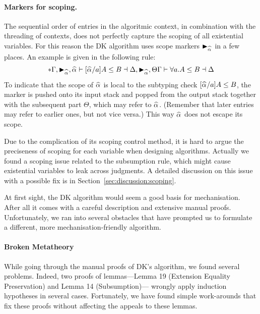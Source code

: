 \paragraph{Markers for scoping.}
The sequential order of entries in the algoritmic context, in combination with
the threading of contexts,  does not perfectly capture the scoping of all
existential variables. For this reason the DK algorithm uses scope markers
$\blacktriangleright_{\al}$ in a few places. An example is given in the following
rule:
\[
\inferrule*
  {\Gamma,\blacktriangleright_{\al}, \al \vdash [\al/a]A \le B \dashv \Delta,\blacktriangleright_{\al},\Theta}
  {\Gamma \vdash \forall a. A \le B \dashv \Delta}
\]
To indicate that the scope of $\al$ is local to the subtyping check
$[\al/a]A \le B$, the marker is pushed onto its input stack and popped
from the output stack together with the subsequent part $\Theta$, which may
refer to $\al$. 
(Remember that later entries may refer to earlier
ones, but not vice versa.) This way $\al$ does not escape its scope.
\begin{comment}
A type variable may have a similar functionality to the scoping markers.
An example rule that checks an expression against a polymorphic type is as follows:
$$
\inferrule*
{\Gm, a \vdash e \Lto A \dashv \Delta, a, \Theta}
{\Gm \vdash e \Lto \all A \dashv \Delta}
$$
\end{comment}

Due to the complication of its scoping control method,
it is hard to argue the preciseness of scoping for each variable when designing algorithms.
Actually we found a scoping issue related to the subsumption rule,
which might cause existential variables to leak across judgments.
A detailed discussion on this issue with a possible fix is in Section~\ref{sec:discussion:scoping}.


At first sight, the DK algorithm would seem a good basis for mechanisation. After
all it comes with a careful description and extensive manual proofs.
Unfortunately, we ran into several obstacles that have prompted us to formulate
a different, more mechanisation-friendly algorithm.

\paragraph{Broken Metatheory} %
While going through the manual proofs of DK's algorithm, we found several
problems.  Indeed, two proofs of lemmas---Lemma 19 (Extension Equality
Preservation) and Lemma 14 (Subsumption)--- wrongly apply induction hypotheses
in several cases. Fortunately, we have found simple work-arounds that fix these
proofs without affecting the appeals to these lemmas.

